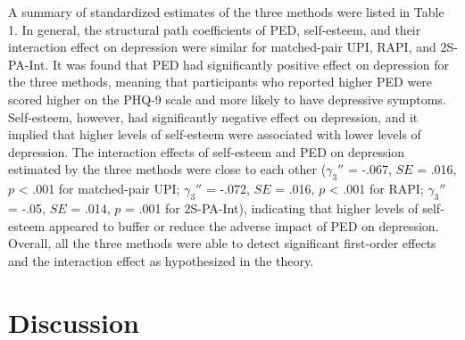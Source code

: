 \documentclass[
  man]{apa7}
\begin{document}
A summary of standardized estimates of the three methods were listed in Table 1. In general, the structural path coefficients of PED, self-esteem, and their interaction effect on depression were similar for matched-pair UPI, RAPI, and 2S-PA-Int. It was found that PED had significantly positive effect on depression for the three methods, meaning that participants who reported higher PED were scored higher on the PHQ-9 scale and more likely to have depressive symptoms. Self-esteem, however, had significantly negative effect on depression, and it implied that higher levels of self-esteem were associated with lower levels of depression. The interaction effects of self-esteem and PED on depression estimated by the three methods were close to each other (\(\gamma_{3}''\) = -.067, \(\textit{SE}\) = .016, \(\textit{p}\) \textless{} .001 for matched-pair UPI; \(\gamma_{3}''\) = -.072, \(\textit{SE}\) = .016, \(\textit{p}\) \textless{} .001 for RAPI; \(\gamma_{3}''\) = -.05, \(\textit{SE}\) = .014, \(\textit{p}\) = .001 for 2S-PA-Int), indicating that higher levels of self-esteem appeared to buffer or reduce the adverse impact of PED on depression. Overall, all the three methods were able to detect significant first-order effects and the interaction effect as hypothesized in the theory.

\hypertarget{discussion}{%
\section{Discussion}\label{discussion}}
\end{document}
